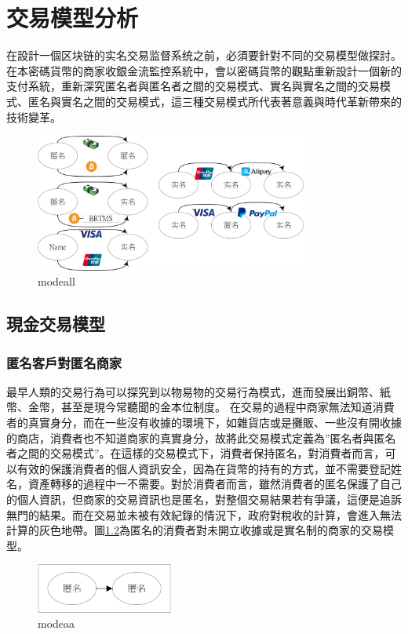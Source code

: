 
\chapter{交易模型分析}
在設計一個区块链的实名交易监督系统之前，必須要針對不同的交易模型做探討。
在本密碼貨幣的商家收銀金流監控系統中，會以密碼貨幣的觀點重新設計一個新的支付系統，重新深究匿名者與匿名者之間的交易模式、實名與實名之間的交易模式、匿名與實名之間的交易模式，這三種交易模式所代表著意義與時代革新帶來的技術變革。
\begin{figure}[h]
	\centering
	\includegraphics[width = 0.8\textwidth]{modeall.png}
	\caption{modeall}\label{modeall}
\end{figure}

	\section{現金交易模型}
		\subsection{匿名客戶對匿名商家}最早人類的交易行為可以探究到以物易物的交易行為模式，進而發展出銅幣、紙幣、金幣，甚至是現今常聽聞的金本位制度。 
		在交易的過程中商家無法知道消費者的真實身分，而在一些沒有收據的環境下，如雜貨店或是攤販、一些沒有開收據的商店，消費者也不知道商家的真實身分，故將此交易模式定義為”匿名者與匿名者之間的交易模式”。在這樣的交易模式下，消費者保持匿名，對消費者而言，可以有效的保護消費者的個人資訊安全，因為在貨幣的持有的方式，並不需要登記姓名，資產轉移的過程中一不需要。對於消費者而言，雖然消費者的匿名保護了自己的個人資訊，但商家的交易資訊也是匿名，對整個交易結果若有爭議，這便是追訴無門的結果。而在交易並未被有效紀錄的情況下，政府對稅收的計算，會進入無法計算的灰色地帶。圖\ref{modeaa}為匿名的消費者對未開立收據或是實名制的商家的交易模型。

		\begin{figure}[h]
			\centering
			\includegraphics[width = 0.4\textwidth]{modeaa.png}
			\caption{modeaa}\label{modeaa}
		\end{figure}

